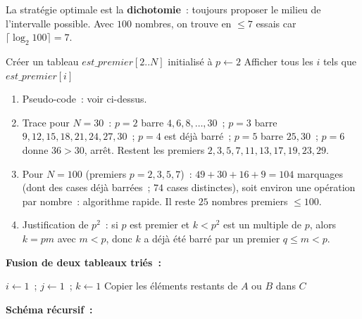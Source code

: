 La strat\'egie optimale est la \textbf{dichotomie}~: toujours proposer le milieu
de l'intervalle possible. Avec $100$ nombres, on trouve en $\leq7$ essais
car $\lceil\log_2 100\rceil=7$.


\begin{algorithm}[H]
\caption{Crible d'\'Eratosth\`ene}
Cr\'eer un tableau $\mathit{est\_premier}[2..N]$ initialis\'e \`a \Vrai\;
$p \leftarrow 2$\;
Afficher tous les $i$ tels que $\mathit{est\_premier}[i]$\;
\end{algorithm}

\begin{enumerate}
  \item Pseudo-code~: voir ci-dessus.
  \item Trace pour $N=30$~: $p=2$ barre $4,6,8,\ldots,30$~; $p=3$ barre $9,12,15,18,21,24,27,30$~; $p=4$ est d\'ej\`a barr\'e~; $p=5$ barre $25,30$~; $p=6$ donne $36>30$, arr\^et.
        Restent les premiers $2,3,5,7,11,13,17,19,23,29$.
  \item Pour $N=100$ (premiers $p=2,3,5,7$)~: $49+30+16+9=104$ marquages (dont des cases d\'ej\`a barr\'ees~; $74$ cases distinctes), soit environ une op\'eration par nombre~: algorithme rapide. Il reste $25$ nombres premiers $\leq100$.
  \item Justification de $p^2$~: si $p$ est premier et $k<p^2$ est un multiple de $p$, alors $k=pm$ avec $m<p$,
        donc $k$ a d\'ej\`a \'et\'e barr\'e par un premier $q\le m<p$.
\end{enumerate}


\textbf{Fusion de deux tableaux tri\'es~:}
\begin{algorithm}[H]
\caption{Fusion}
$i\leftarrow1$~; $j\leftarrow1$~; $k\leftarrow1$\;
Copier les \'el\'ements restants de $A$ ou $B$ dans $C$\;
\end{algorithm}

\textbf{Sch\'ema r\'ecursif~:}
\begin{algorithm}[H]
\caption{Tri fusion (sch\'ema)}
\end{algorithm}

